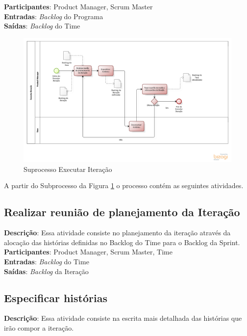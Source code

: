   \textbf{Participantes}: Product Manager, Scrum Master\\
  
  \textbf{Entradas}: \textit{Backlog} do Programa \\
  
  \textbf{Saídas}:   \textit{Backlog} do Time \\

\begin{figure}[!htb]
\centering
\includegraphics[scale=0.5]{figuras/iteracao.png}
\caption{Suprocesso Executar Iteração}
\label{fig:iteracao}
\end{figure}

A partir do Subprocesso da Figura \ref{fig:iteracao} o processo contém as seguintes atividades.

\subsection{Realizar reunião de planejamento da Iteração}
  \textbf{Descrição}: Essa atividade consiste no planejamento da iteração através da alocação das histórias definidas no Backlog do Time para o Backlog da Sprint. \\
  
  \textbf{Participantes}: Product Manager, Scrum Master, Time\\
  
  \textbf{Entradas}: \textit{Backlog} do Time \\
  
  \textbf{Saídas}:  \textit{Backlog} da Iteração\\

\subsection{Especificar histórias}
  \textbf{Descrição}: Essa atividade consiste na escrita mais detalhada das histórias que irão compor a 
iteração. \\
  
